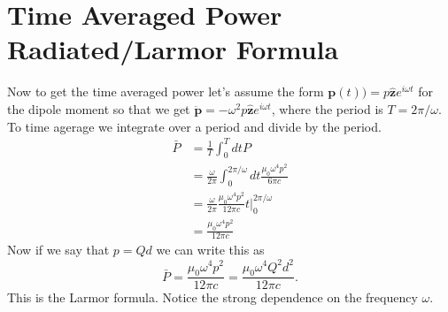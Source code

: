 \documentclass[12pt]{article}
\newcommand{\pdd}{\ddot{\mathbf{p}}}
\begin{document}
\section*{Time Averaged Power Radiated/Larmor Formula}
Now to get the time averaged power let's assume the form $\mathbf{p}(t)) = p\hat{\mathbf{z}}e^{i\omega t}$ for the dipole moment so that we get $\pdd = -\omega^2p\hat{\mathbf{z}}e^{i\omega t}$, where the period is $T=2\pi/\omega$. To time agerage we integrate over a period and divide by the period.
\begin{align}
   \bar{P} &= \frac{1}{T} \int_0^T dt P \\
   &= \frac{\omega}{2\pi} \int_0^{2\pi/\omega} dt \frac{\mu_0\omega^4p^2}{6\pi c} \\
   &= \frac{\omega}{2\pi} \frac{\mu_0\omega^4p^2}{12\pi c} t \bigg|_0^{2\pi/\omega} \\
   &= \frac{\mu_0\omega^4p^2}{12\pi c}
\end{align}
Now if we say that $p=Qd$ we can write this as
\begin{equation}
   \bar{P} = \frac{\mu_0\omega^4p^2}{12\pi c} = \frac{\mu_0\omega^4Q^2d^2}{12\pi c}.
\end{equation}
This is the Larmor formula. Notice the strong dependence on the frequency $\omega$.
\end{document}
